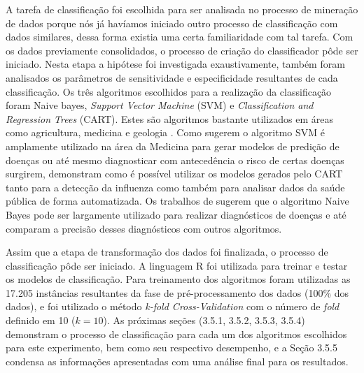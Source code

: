 A tarefa de classificação foi escolhida para ser analisada no processo de mineração de dados porque nós já havíamos iniciado outro processo de classificação com dados similares, dessa forma existia uma certa familiaridade com tal tarefa. Com os dados previamente consolidados, o processo de criação do classificador pôde ser iniciado. Nesta etapa a hipótese foi investigada exaustivamente, também foram analisados os parâmetros de sensitividade e especificidade resultantes de cada classificação. Os três algoritmos escolhidos para a realização da classificação foram Naive bayes, \textit{Support Vector Machine} (SVM) e \textit{Classification and Regression Trees} (CART). Estes são algoritmos bastante utilizados em áreas como agricultura, medicina e geologia \cite{dong2014nonlinear}. Como  sugerem o algoritmo SVM é amplamente utilizado na área da Medicina para gerar modelos de predição de doenças ou até mesmo diagnosticar com antecedência o risco de certas doenças surgirem, 
 demonstram como é possível utilizar os modelos gerados pelo CART tanto para a detecção da influenza como também para analisar dados da saúde pública de forma automatizada. Os trabalhos de  sugerem que o algoritmo Naive Bayes pode ser largamente utilizado para realizar diagnósticos de doenças e até comparam a precisão desses diagnósticos com outros algoritmos.

Assim que a etapa de transformação dos dados foi finalizada, o processo de classificação pôde ser iniciado. A linguagem R foi utilizada para treinar e testar os modelos de classificação. Para treinamento dos algoritmos foram utilizadas as 17.205 instâncias resultantes da fase de pré-processamento dos dados (100\% dos dados), e foi utilizado o método \textit{k-fold Cross-Validation} com o número de \textit{fold} definido em 10 ($k = 10$). As próximas seções (3.5.1, 3.5.2, 3.5.3, 3.5.4) demonstram o processo de classificação para cada um dos algoritmos escolhidos para este experimento, bem como seu respectivo desempenho, e a Seção 3.5.5 condensa as informações apresentadas com uma análise final para os resultados.

